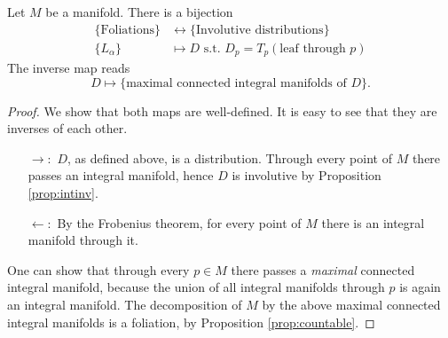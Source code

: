 \begin{theorem}
    Let $M$ be a manifold. There is a bijection
  \begin{align*}
   \{\text{Foliations}\}  &\leftrightarrow \{\text{Involutive distributions}\}\\
   \{L_{\alpha}\} &\mapsto D \text{ s.t. } D_p=T_p(\text{leaf through $p$})
\end{align*}
The inverse map reads
$$D\mapsto \{\text{maximal connected   integral manifolds of $D$}\}.$$
\end{theorem}
\begin{proof}
We show that both maps are well-defined. It is easy to see that they are inverses of each other.

\begin{itemize}
    \item[$\rightarrow:$]$D$, as defined above, is a distribution. Through every point of $M$ there passes an integral manifold, hence $D$ is involutive by Proposition \ref{prop:intinv}.
        
    \item[$\leftarrow:$] By the Frobenius theorem, for every point of $M$ there is an integral manifold through it.
\end{itemize}
        
    One can show that through every $p\in M$ there passes a \emph{maximal} connected integral manifold, because the union of all integral manifolds through $p$ is again an integral manifold.
 The decomposition of $M$ by the above maximal connected integral manifolds is a foliation, by Proposition \ref{prop:countable}.
\end{proof}














